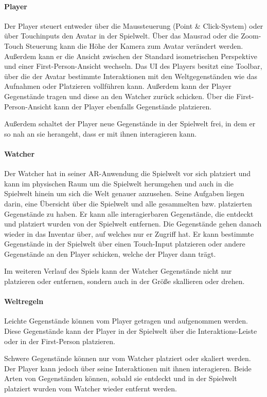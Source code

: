 \paragraph{Player}
Der Player steuert entweder über die Maussteuerung (Point \& Click-System) oder über Touchinputs den Avatar in der Spielwelt. Über das Mausrad oder die Zoom-Touch Steuerung kann die Höhe der Kamera zum Avatar verändert werden. Außerdem kann er die Ansicht zwischen der Standard isometrischen Perspektive und einer First-Person-Ansicht wechseln. Das \ac{UI} des Players besitzt eine Toolbar, über die der Avatar bestimmte Interaktionen mit den Weltgegenständen wie das Aufnahmen oder Platzieren vollführen kann. Außerdem kann der Player Gegenstände tragen und diese an den Watcher zurück schicken. Über die First-Person-Ansicht kann der Player ebenfalls Gegenstände platzieren.

Außerdem schaltet der Player neue Gegenstände in der Spielwelt frei, in dem er so nah an sie herangeht, dass er mit ihnen interagieren kann.

\paragraph{Watcher}
Der Watcher hat in seiner \ac{AR}-Anwendung die Spielwelt vor sich platziert und kann im physischen Raum um die Spielwelt herumgehen und auch in die Spielwelt hinein um sich die Welt genauer anzusehen. Seine Aufgaben liegen darin, eine Übersicht über die Spielwelt und alle gesammelten bzw. platzierten Gegenstände zu haben. Er kann alle interagierbaren Gegenstände, die entdeckt und platziert wurden von der Spielwelt entfernen. Die Gegenstände gehen danach wieder in das Inventar über, auf welches nur er Zugriff hat. Er kann bestimmte Gegenstände in der Spielwelt über einen Touch-Input platzieren oder andere Gegenstände an den Player schicken, welche der Player dann trägt. 

Im weiteren Verlauf des Spiels kann der Watcher Gegenstände nicht nur platzieren oder entfernen, sondern auch in der Größe skallieren oder drehen.

\paragraph{Weltregeln}
Leichte Gegenstände können vom Player getragen und aufgenommen werden. Diese Gegenstände kann der Player in der Spielwelt über die Interaktions-Leiste oder in der First-Person platzieren. 

Schwere Gegenstände können nur vom Watcher platziert oder skaliert werden. Der Player kann jedoch über seine Interaktionen mit ihnen interagieren. Beide Arten von Gegenständen können, sobald sie entdeckt und in der Spielwelt platziert wurden vom Watcher wieder entfernt werden.

